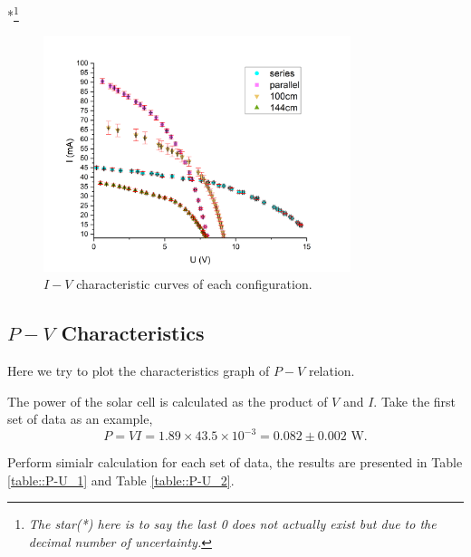 \documentclass[a4paper]{article}
\begin{document}
*\footnote{\textit{The star(*) here is to say the last 0 does not actually exist but due to the decimal number of uncertainty.}}

\begin{figure}[H]
	\centering
	\includegraphics[width=0.8\textwidth]{I-V characteristic.png}
	\caption{$I-V$ characteristic curves of each configuration.}
	\label{fig::I-V}
\end{figure}

\subsection{$P-V$ Characteristics}

Here we try to plot the characteristics graph of $P-V$ relation.

The power of the solar cell is calculated as the product of $V$ and $I$. Take the first set of data as an example,
$$P = VI = 1.89 \times 43.5 \times 10^{-3} = 0.082 \pm 0.002\,\,\text{W}.$$

Perform simialr calculation for each set of data, the results are presented in Table \ref{table::P-U_1} and Table \ref{table::P-U_2}.
\end{document}
